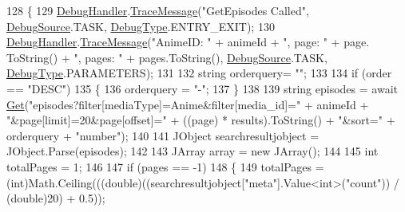 \begin{DoxyCode}
128         \{
129             \mbox{\hyperlink{class_little_weeb_library_1_1_handlers_1_1_kitsu_handler_a6d3c55fa5eee15320845c2d902c96882}{DebugHandler}}.\mbox{\hyperlink{interface_little_weeb_library_1_1_handlers_1_1_i_debug_handler_a2e405bc3492e683cd3702fae125221bc}{TraceMessage}}(\textcolor{stringliteral}{"GetEpisodes Called"}, 
      \mbox{\hyperlink{namespace_little_weeb_library_1_1_handlers_a2a6ca0775121c9c503d58aa254d292be}{DebugSource}}.TASK, \mbox{\hyperlink{namespace_little_weeb_library_1_1_handlers_ab66019ed40462876ec4e61bb3ccb0a62}{DebugType}}.ENTRY\_EXIT);
130             \mbox{\hyperlink{class_little_weeb_library_1_1_handlers_1_1_kitsu_handler_a6d3c55fa5eee15320845c2d902c96882}{DebugHandler}}.\mbox{\hyperlink{interface_little_weeb_library_1_1_handlers_1_1_i_debug_handler_a2e405bc3492e683cd3702fae125221bc}{TraceMessage}}(\textcolor{stringliteral}{"AnimeID: "} + animeId + \textcolor{stringliteral}{", page: "} + page.
      ToString() + \textcolor{stringliteral}{", pages: "} + pages.ToString(), \mbox{\hyperlink{namespace_little_weeb_library_1_1_handlers_a2a6ca0775121c9c503d58aa254d292be}{DebugSource}}.TASK, \mbox{\hyperlink{namespace_little_weeb_library_1_1_handlers_ab66019ed40462876ec4e61bb3ccb0a62}{DebugType}}.PARAMETERS);
131 
132             \textcolor{keywordtype}{string} orderquery= \textcolor{stringliteral}{""};
133 
134             \textcolor{keywordflow}{if} (order == \textcolor{stringliteral}{"DESC"})
135             \{
136                 orderquery = \textcolor{stringliteral}{"-"};
137             \}
138 
139             \textcolor{keywordtype}{string} episodes = await \mbox{\hyperlink{class_little_weeb_library_1_1_handlers_1_1_kitsu_handler_a8b7c629a03096c3152252f6b5cf2937f}{Get}}(\textcolor{stringliteral}{"episodes?filter[mediaType]=Anime&filter[media\_id]="} + animeId +
       \textcolor{stringliteral}{"&page[limit]=20&page[offset]="} + ((page) * results).ToString() + \textcolor{stringliteral}{"&sort="} + orderquery + \textcolor{stringliteral}{"number"});
140 
141             JObject searchresultjobject = JObject.Parse(episodes);
142 
143             JArray array = \textcolor{keyword}{new} JArray();
144 
145             \textcolor{keywordtype}{int} totalPages = 1;
146 
147             \textcolor{keywordflow}{if} (pages == -1)
148             \{
149                 totalPages = (int)Math.Ceiling(((\textcolor{keywordtype}{double})((searchresultjobject[\textcolor{stringliteral}{"meta"}].Value<\textcolor{keywordtype}{int}>(\textcolor{stringliteral}{"count"})) 
      / (\textcolor{keywordtype}{double})20) + 0.5));

\end{DoxyCode}

